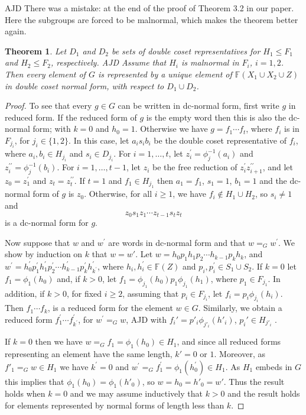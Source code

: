 \documentclass[a4paper,12pt]{article}
\newtheorem{theorem}{Theorem}[section]
\numberwithin{equation}{section}
\numberwithin{figure}{section}
\newcommand{\FF}{\ensuremath{\mathbb{F}}}
\newenvironment{ajd1}{\noindent\color{red} AJD }{}
\newcommand{\ajd}[1]{\begin{ajd1} #1 \end{ajd1}}
\begin{document}
\ajd{There was a mistake: at the end of the proof of Theorem 3.2 in our paper.
Here the subgroups are forced to be malnormal, which makes the theorem better
again.}
\begin{theorem}\label{thm:dcnf} Let $D_1$ and $D_2$ be sets of  double coset representatives for
$H_1\le F_1$ and $H_2\le F_2$, respectively. \ajd{Assume that
$H_i$ is malnormal in $F_i$, $i=1,2$.}  
Then every element of $G$ is represented by a unique element of
$\FF(X_1\cup X_2\cup Z)$ in double coset normal form, with respect
to $D_1\cup D_2$.
\end{theorem}
\begin{proof}
To see that every $g\in G$ can be written in dc-normal form, first
write $g$ in reduced form. If the reduced form of $g$ is the empty
word then this is also the dc-normal form; with $k=0$ and $h_0=1$. 
Otherwise we have $g=f_1\cdots f_t$, where $f_i$ is in $F_{j_i}$, for
$j_i\in \{1,2\}$. In this case, let $a_is_ib_i$
be the double coset representative of $f_i$, where 
$a_i,b_i\in H_{j_i}$ and $s_i\in D_{j_i}$. For $i=1,\ldots ,t$,
 let $z^{\prime}_i=\phi_j^{-1}(a_i)$ and
$z^{\prime\prime}_i=\phi_j^{-1}(b_i)$. For $i=1,\ldots ,t-1$, let 
$z_i$ be the free reduction of $z^{\prime}_iz^{\prime\prime}_{i+1}$, 
and let $z_0=z^{\prime}_1$ and $z_t=
z^{\prime\prime}_t$. 
 If $t=1$ and $f_1\in H_{j_1}$ then $a_1=f_1$, $s_1=1$, $b_1=1$ and 
the dc-normal form of $g$ is $z_0$. Otherwise, for all $i\ge 1$, we 
have $f_i\notin H_1\cup H_2$, so $s_i\neq 1$ and 
\[z_0s_1z_1\cdots z_{t-1}s_tz_t\]
is a dc-normal form for $g$.

Now suppose that $w$ and $w^\prime$ are words in dc-normal form and that
$w=_G w^\prime$. We show by induction on $k$ that $w=w'$. 
Let $w=h_{0}p_1h_{1}p_2 \cdots h_{k-1}p_kh_{{k}}$,
and $w^\prime =h_{0}^\prime p_1^\prime h_{1}^\prime  p_2^\prime
\cdots h_{k-1}^\prime p_k^\prime h_{{k^\prime}}^\prime$, where
$h_i, h_i^\prime\in \FF(Z)$ and $p_i,p_i^\prime\in S_1\cup S_2$.
If $k=0$ let $f_1=\phi_1(h_0)$ and, if $k>0$, 
let $f_1=\phi_{j_1}(h_0)p_1\phi_{j_1}(h_1)$, where $p_1\in F_{j_1}$. 
 In addition, if $k>0$,  
 for fixed $i\ge 2$, assuming that $p_i\in F_{j_i}$, 
let $f_i=p_i\phi_{j_i}(h_i)$.
 Then $f_1\cdots f_k$, is
a reduced form for the element $w\in G$. Similarly, we obtain a reduced
form $f_1^\prime \cdots f_{k^\prime}^\prime$, for $w^\prime=_G w$,\ajd{ 
with
$f_i'=p'_i\phi_{j'_i}(h'_i)$, $p_i'\in H_{j'_i}$}. 

If $k=0$ then we have $w=_G f_1=\phi_1(h_0)\in H_{1}$, and since all 
reduced forms representing an element have the same length, $k'=0$ or $1$. 
Moreover, as $f'_1=_G w\in H_1$ we have 
 $k^\prime =0$ and $w^\prime=_G f_1^\prime=\phi_1(h_0^\prime)\in H_1$.
As $H_1$ embeds in $G$ this implies that $\phi_1(h_0)=\phi_1(h'_0)$, so
$w=h_0=h'_0=w'$. Thus the result
holds when $k=0$ and we may assume inductively that $k>0$ and the result holds
for elements represented by normal forms of length less than $k$.


\end{proof}
\end{document}
